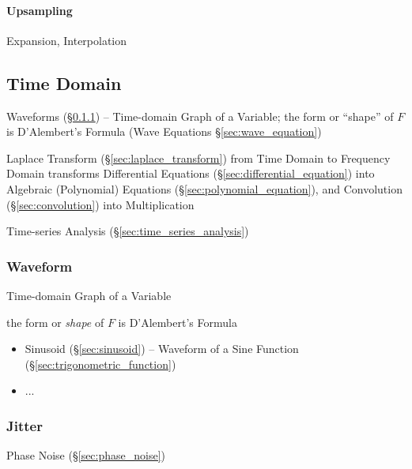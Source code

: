 \paragraph{Upsampling}\label{sec:upsampling}\hfill

Expansion, Interpolation



\subsection{Time Domain}\label{sec:time_domain}

Waveforms (\S\ref{sec:waveform}) -- Time-domain Graph of a Variable; the form or
``shape'' of $F$ is D'Alembert's Formula (Wave Equations
\S\ref{sec:wave_equation})

Laplace Transform (\S\ref{sec:laplace_transform}) from Time Domain to Frequency
Domain transforms Differential Equations (\S\ref{sec:differential_equation})
into Algebraic (Polynomial) Equations (\S\ref{sec:polynomial_equation}), and
Convolution (\S\ref{sec:convolution}) into Multiplication

\fist Time-series Analysis (\S\ref{sec:time_series_analysis})



\subsubsection{Waveform}\label{sec:waveform}

Time-domain Graph of a Variable

the form or \emph{shape} of $F$ is D'Alembert's Formula

\begin{itemize}
  \item Sinusoid (\S\ref{sec:sinusoid}) -- Waveform of a Sine Function
    (\S\ref{sec:trigonometric_function})
  \item ...
\end{itemize}



\subsubsection{Jitter}\label{sec:jitter}

Phase Noise (\S\ref{sec:phase_noise})



